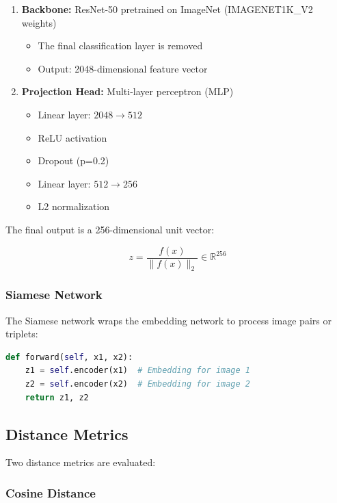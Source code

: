 \documentclass[12pt,a4paper]{article}
\begin{document}
\begin{enumerate}
    \item \textbf{Backbone:} ResNet-50 pretrained on ImageNet (IMAGENET1K\_V2 weights)
    \begin{itemize}
        \item The final classification layer is removed
        \item Output: 2048-dimensional feature vector
    \end{itemize}
    
    \item \textbf{Projection Head:} Multi-layer perceptron (MLP)
    \begin{itemize}
        \item Linear layer: $2048 \rightarrow 512$
        \item ReLU activation
        \item Dropout (p=0.2)
        \item Linear layer: $512 \rightarrow 256$
        \item L2 normalization
    \end{itemize}
\end{enumerate}

The final output is a 256-dimensional unit vector:

\begin{equation}
    z = \frac{f(x)}{\|f(x)\|_2} \in \mathbb{R}^{256}
\end{equation}

\subsubsection{Siamese Network}

The Siamese network wraps the embedding network to process image pairs or triplets:

\begin{lstlisting}[language=Python, caption=Siamese Network Forward Pass]
def forward(self, x1, x2):
    z1 = self.encoder(x1)  # Embedding for image 1
    z2 = self.encoder(x2)  # Embedding for image 2
    return z1, z2
\end{lstlisting}

\subsection{Distance Metrics}

Two distance metrics are evaluated:

\subsubsection{Cosine Distance}
\end{document}
